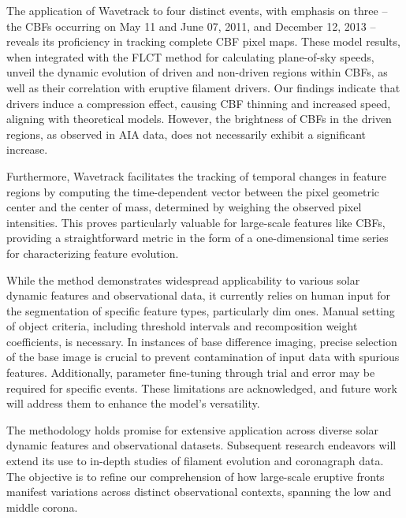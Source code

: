 The application of Wavetrack to four distinct events, with emphasis on three – the CBFs occurring on May 11 and June 07, 2011, and December 12, 2013 – reveals its proficiency in tracking complete CBF pixel maps. These model results, when integrated with the FLCT method for calculating plane-of-sky speeds, unveil the dynamic evolution of driven and non-driven regions within CBFs, as well as their correlation with eruptive filament drivers. Our findings indicate that drivers induce a compression effect, causing CBF thinning and increased speed, aligning with theoretical models. However, the brightness of CBFs in the driven regions, as observed in AIA data, does not necessarily exhibit a significant increase.

Furthermore, Wavetrack facilitates the tracking of temporal changes in feature regions by computing the time-dependent vector between the pixel geometric center and the center of mass, determined by weighing the observed pixel intensities. This proves particularly valuable for large-scale features like CBFs, providing a straightforward metric in the form of a one-dimensional time series for characterizing feature evolution.

While the method demonstrates widespread applicability to various solar dynamic features and observational data, it currently relies on human input for the segmentation of specific feature types, particularly dim ones. Manual setting of object criteria, including threshold intervals and recomposition weight coefficients, is necessary. In instances of base difference imaging, precise selection of the base image is crucial to prevent contamination of input data with spurious features. Additionally, parameter fine-tuning through trial and error may be required for specific events. These limitations are acknowledged, and future work will address them to enhance the model's versatility.

The methodology holds promise for extensive application across diverse solar dynamic features and observational datasets. Subsequent research endeavors will extend its use to in-depth studies of filament evolution and coronagraph data. The objective is to refine our comprehension of how large-scale eruptive fronts manifest variations across distinct observational contexts, spanning the low and middle corona.

